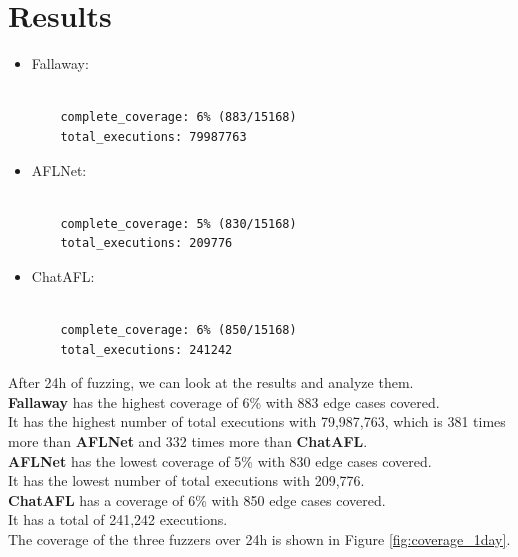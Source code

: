 \chapter{Results}
\label{chap:Results}
\begin{itemize}
    \item Fallaway:
    \begin{lstlisting}

    complete_coverage: 6% (883/15168)
    total_executions: 79987763
    \end{lstlisting}
    
    \item AFLNet:
    \begin{lstlisting}
    
    complete_coverage: 5% (830/15168)
    total_executions: 209776
    \end{lstlisting}
    
    \item ChatAFL:
    \begin{lstlisting}
    
    complete_coverage: 6% (850/15168)
    total_executions: 241242
    \end{lstlisting}
\end{itemize}
After 24h of fuzzing, we can look at the results and analyze them.
\\\textbf{Fallaway} has the highest coverage of 6\% with 883 edge cases covered.
\\It has the highest number of total executions with 79,987,763, which is 381 times more than \textbf{AFLNet} and 332 times more than \textbf{ChatAFL}.
\\\textbf{AFLNet} has the lowest coverage of 5\% with 830 edge cases covered.
\\It has the lowest number of total executions with 209,776.
\\\textbf{ChatAFL} has a coverage of 6\% with 850 edge cases covered.
\\It has a total of 241,242 executions.
\\The coverage of the three fuzzers over 24h is shown in Figure \ref{fig:coverage_1day}.

